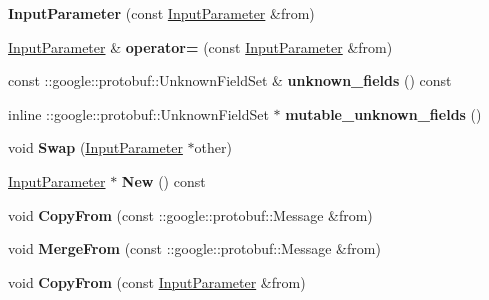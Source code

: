 \begin{DoxyCompactItemize}
{\bfseries Input\+Parameter} (const \mbox{\hyperlink{classcaffe_1_1_input_parameter}{Input\+Parameter}} \&from)
\item 
\mbox{\label{classcaffe_1_1_input_parameter_a938b6e3a6f4e4971580b6e15b6e26771}} 
\mbox{\hyperlink{classcaffe_1_1_input_parameter}{Input\+Parameter}} \& {\bfseries operator=} (const \mbox{\hyperlink{classcaffe_1_1_input_parameter}{Input\+Parameter}} \&from)
\item 
\mbox{\label{classcaffe_1_1_input_parameter_af7b2adc5748e48c34b06284f503805d6}} 
const \+::google\+::protobuf\+::\+Unknown\+Field\+Set \& {\bfseries unknown\+\_\+fields} () const
\item 
\mbox{\label{classcaffe_1_1_input_parameter_a240d02c33beb17f329ea4c3e28b409b0}} 
inline \+::google\+::protobuf\+::\+Unknown\+Field\+Set $\ast$ {\bfseries mutable\+\_\+unknown\+\_\+fields} ()
\item 
\mbox{\label{classcaffe_1_1_input_parameter_af6fc9b057c06389b7bec857e440ded39}} 
void {\bfseries Swap} (\mbox{\hyperlink{classcaffe_1_1_input_parameter}{Input\+Parameter}} $\ast$other)
\item 
\mbox{\label{classcaffe_1_1_input_parameter_ac72c8f1f1aaa912d6ebf2cc5655944fd}} 
\mbox{\hyperlink{classcaffe_1_1_input_parameter}{Input\+Parameter}} $\ast$ {\bfseries New} () const
\item 
\mbox{\label{classcaffe_1_1_input_parameter_aac255a9730d65111ec00ac61a3a92a45}} 
void {\bfseries Copy\+From} (const \+::google\+::protobuf\+::\+Message \&from)
\item 
\mbox{\label{classcaffe_1_1_input_parameter_a49ba699dae00420b356b64c73586410e}} 
void {\bfseries Merge\+From} (const \+::google\+::protobuf\+::\+Message \&from)
\item 
\mbox{\label{classcaffe_1_1_input_parameter_a29f83de0edab49e2b3f6513dad9edbe1}} 
void {\bfseries Copy\+From} (const \mbox{\hyperlink{classcaffe_1_1_input_parameter}{Input\+Parameter}} \&from)

\end{DoxyCompactItemize}

